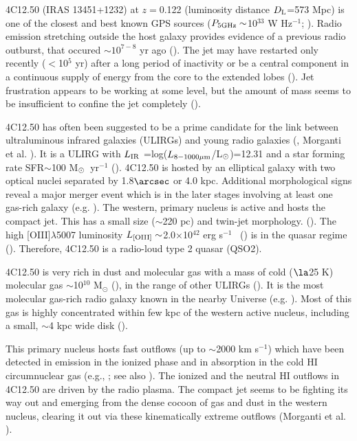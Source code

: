 \documentclass{aa}
\newcommand{\msun}{M$_{\rm \odot}$~}
\newcommand{\ergs}{erg s$^{-1}$}
\begin{document}
 4C12.50 (IRAS 13451+1232) at $z=$0.122  (luminosity distance $D_{\rm L}$=573 Mpc) is one of the closest and best known GPS sources ($P_{\rm 5GHz}\sim$10$^{33}$ W Hz$^{-1}$; \citealt{ODea1998,Holt2003}).  Radio emission stretching  outside the host galaxy provides evidence of a previous radio outburst, that occured $\sim10^{7-8}$ yr ago (\citealt{Stanghellini2005}). The jet may have restarted only recently  ($<$10$^5$ yr) after a long period of inactivity or be a central component in a  continuous supply of energy from the  core to the extended lobes (\citealt{Lister2003,Odea2000,Stanghellini2005,Morganti2013}).
Jet frustration appears to be working at some level, but the amount of mass seems to be insufficient to confine the jet completely (\citealt{Morganti2004,Morganti2013}).

4C12.50 has often been suggested to be a prime candidate for the link between ultraluminous infrared galaxies
 (ULIRGs) and young radio galaxies (\citealt{Gilmore1986}, Morganti et al.   \citeyear{Morganti2003,Morganti2013}).  
It is  a ULIRG with $L_{\rm IR}$ =log($L_{\rm 8-1000 \mu m}$/L$_{\rm \odot}$)=12.31 and a  star forming rate SFR$\sim$100 \msun yr$^{-1}$ (\citealt{Mirabel1989b,Rupke2005a,Perna2021,Pereira2021}).
4C12.50 is hosted by an elliptical galaxy with two optical nuclei separated by 1.8$\arcsec$ or 4.0 kpc.  Additional morphological signs reveal a major merger event  which is in the later stages involving at least one gas-rich galaxy (e.g. \citealt{Heckman1986,Emonts2016}). The western, primary nucleus is active and hosts the compact jet. This has a small  size ($\sim$220 pc) and twin-jet morphology. (\citealt{Grandi1977,Gilmore1986,Veilleux1997}).  The high [OIII]$\lambda$5007 luminosity $L_ {\rm [OIII]}\sim$2.0$\times$10$^{42}$ \ergs~ (\citealt{Tadhunter2011}) is in the quasar regime (\citealt{Zakamska2003}). Therefore, 4C12.50 is a radio-loud type 2 quasar (QSO2). 


4C12.50 is very rich in dust and molecular gas  with a mass of  cold ($\la$25 K) molecular gas   $\sim$10$^{10}$ M$_{\odot}$ (\citealt{Dasyra2012}), in the range of other ULIRGs (\citealt{Mirabel1989,Evans1999,Solomon2005}). It is  the most molecular gas-rich radio galaxy known in the nearby Universe (e.g. \citealt{Ocana2010,Smolvic2011}). Most of this gas is highly concentrated within few kpc of the western active  nucleus, including a small, $\sim$4 kpc wide disk (\citealt{Fotopoulou2019}). 
  

This primary nucleus  hosts  fast  outflows  (up to $\sim$2000 km s$^{-1}$)  which have been  detected  in emission in the  ionized phase and in absorption in the cold HI   circumnuclear gas  (e.g.\citealt{Holt2003,Holt2011,Spoon2009a}, \citealt{Morganti2005,Rose2018}; see also \citealt{Rupke2005a}).  
 The ionized  and the neutral HI outflows in 4C12.50 are  driven by  the radio plasma.  The compact jet seems to be  fighting its way out and emerging from  the dense cocoon of gas and dust in the western nucleus, clearing it out via these kinematically extreme outflows (Morganti et al.   \citeyear{Morganti2003,Morganti2013}).  
\end{document}
